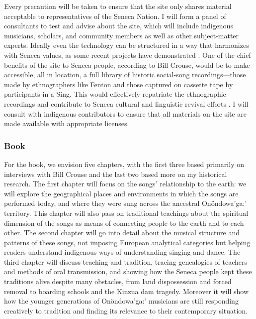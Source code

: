 \documentclass{neh}
\begin{document}
Every precaution will be taken to ensure that the site only shares material
acceptable to representatives of the Seneca Nation.
I will form a panel of consultants to test and advise about the site, which
will include indigenous musicians, scholars, and community members as well as
other subject-matter experts.
Ideally even the technology can be structured in a way that harmonizes with
Seneca values, as some recent projects have demonstrated
\Autocite{Christen:RelationshipsNotRecords}.
One of the chief benefits of the site to Seneca people, according to Bill
Crouse, would be to make accessible, all in location, a full library of
historic social-song recordings---those made by ethnographers like Fenton and
those captured on cassette tape by participants in a Sing.
This would effectively repatriate the ethnographic recordings and contribute
to Seneca cultural and linguistic revival efforts
\Autocite{Fox:Repatriation}.
I will consult with indigenous contributors to ensure that all materials on
the site are made available with appropriate licenses.

\subsubsection{Book}

For the book, we envision five chapters, with the first three based primarily
on interviews with Bill Crouse and the last two based more on my historical
research.
The first chapter will focus on the songs' relationship to the earth:
we will explore the geographical places and environments in which the songs
are performed today, and where they were sung across the ancestral
Onöndowa’ga:’ territory.
This chapter will also pass on traditional teachings about the spiritual
dimension of the songs as means of connecting people to the earth and to each
other.
The second chapter will go into detail about the musical structure and
patterns of these songs, not imposing European analytical categories but
helping readers understand indigenous ways of understanding singing and dance.
The third chapter will discuss teaching and tradition, tracing genealogies of
teachers and methods of oral transmission, and showing how the Seneca people
kept these traditions alive despite many obstacles, from land dispossession
and forced removal to boarding schools and the Kinzua dam tragedy.
Moreover it will show how the younger generations of Onöndowa'ga:' musicians
are still responding creatively to tradition and finding its relevance to
their contemporary situation.
\end{document}
